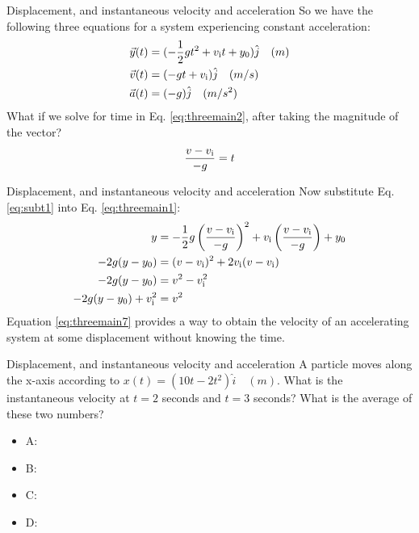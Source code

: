 \documentclass{beamer}
\begin{document}
\begin{frame}{Displacement, and instantaneous velocity and acceleration}
So we have the following three equations for a system experiencing constant acceleration:
\begin{align}
\vec{y}(t) &= (-\frac{1}{2}gt^2+v_{\rm i}t+y_{\rm 0}) \hat{j} \quad (m) \label{eq:threemain1} \\
\vec{v}(t) &= (-gt + v_{\rm i}) \hat{j} \quad (m/s) \label{eq:threemain2} \\
\vec{a}(t) &= (-g) \hat{j} \quad (m/s^2) \label{eq:threemain3}
\end{align}
What if we solve for time in Eq. \ref{eq:threemain2}, after taking the magnitude of the vector? \\
\begin{equation}
\frac{v-v_{\rm i}}{-g} = t
\label{eq:subt1}
\end{equation}
\end{frame}

\begin{frame}{Displacement, and instantaneous velocity and acceleration}
Now substitute Eq. \ref{eq:subt1} into Eq. \ref{eq:threemain1}:\\
\begin{align}
y &= -\frac{1}{2}g\left(\frac{v-v_{\rm i}}{-g}\right)^2+v_{\rm i}\left(\frac{v-v_{\rm i}}{-g}\right)+y_{\rm 0} \label{eq:threemain4} \\ 
-2g(y-y_{\rm 0}) &= (v-v_{\rm i})^2 + 2v_{\rm i}(v-v_{\rm i}) \label{eq:threemain5} \\
-2g(y-y_{\rm 0}) &= v^2-v_{\rm i}^2 \label{eq:threemain6} \\
-2g(y-y_{\rm 0})+v_{\rm i}^2 &= v^2 \label{eq:threemain7}
\end{align}
Equation \ref{eq:threemain7} provides a way to obtain the velocity of an accelerating system at some displacement without knowing the time.
\end{frame}

\begin{frame}{Displacement, and instantaneous velocity and acceleration}
A particle moves along the x-axis according to $x(t) = (10t-2t^2)\hat{i} \quad (m)$.  What is the instantaneous velocity
at $t=2$ seconds and $t=3$ seconds? What is the average of these two numbers?
\begin{itemize}
\item A:
\item B:
\item C:
\item D:
\end{itemize}
\end{frame}
\end{document}
